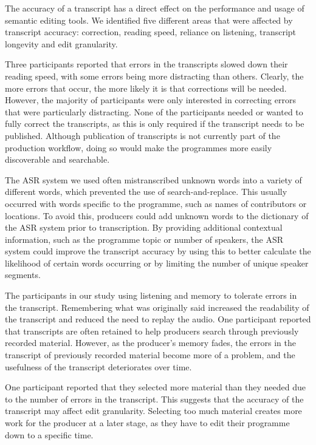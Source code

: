 The accuracy of a transcript has a direct effect on the performance and usage of semantic editing tools. We identified
five different areas that were affected by transcript accuracy: correction, reading speed, reliance on listening,
transcript longevity and edit granularity.

Three participants reported that errors in the transcripts slowed down their reading speed, with some errors being more
distracting than others.  Clearly, the more errors that occur, the more likely it is that corrections will be needed.
However, the majority of participants were only interested in correcting errors that were particularly distracting.
None of the participants needed or wanted to fully correct the transcripts, as this is only required if the transcript
needs to be published. Although publication of transcripts is not currently part of the production
workflow, doing so would make the programmes more easily discoverable and searchable.

The ASR system we used often mistranscribed unknown words into a variety of different words, which prevented the use of
search-and-replace.  This usually occurred with words specific to the programme, such as names of contributors or
locations. To avoid this, producers could add unknown words to the dictionary of the ASR system prior to transcription.
By providing additional contextual information, such as the programme topic or number of speakers, the ASR system could
improve the transcript accuracy by using this to better calculate the likelihood of certain words occurring or by
limiting the number of unique speaker segments.

The participants in our study using listening and memory to tolerate errors in the transcript.  Remembering what was
originally said increased the readability of the transcript and reduced the need to replay the audio.  One participant
reported that transcripts are often retained to help producers search through previously recorded material. However, as
the producer's memory fades, the errors in the transcript of previously recorded material become more of a problem, and
the usefulness of the transcript deteriorates over time.

One participant reported that they selected more material than they needed due to the number of errors in the
transcript.  This suggests that the accuracy of the transcript may affect edit granularity.  Selecting too much
material creates more work for the producer at a later stage, as they have to edit their programme down to a
specific time.


